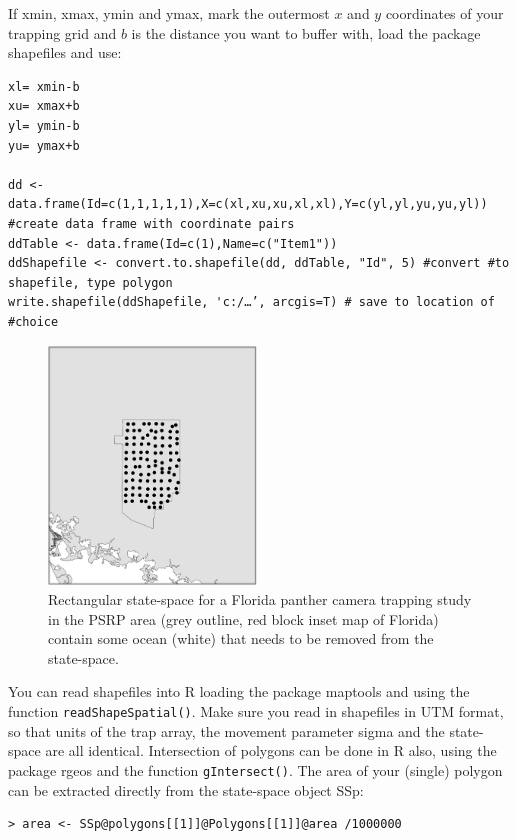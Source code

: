 If xmin, xmax, ymin and ymax, mark the outermost $x$ and $y$ coordinates of your trapping grid and $b$ is the distance you want to buffer with, load the package shapefiles \citep{stabler:2006} and use:
\begin{verbatim}
xl= xmin-b
xu= xmax+b
yl= ymin-b
yu= ymax+b

dd <- data.frame(Id=c(1,1,1,1,1),X=c(xl,xu,xu,xl,xl),Y=c(yl,yl,yu,yu,yl)) #create data frame with coordinate pairs
ddTable <- data.frame(Id=c(1),Name=c("Item1"))
ddShapefile <- convert.to.shapefile(dd, ddTable, "Id", 5) #convert #to shapefile, type polygon
write.shapefile(ddShapefile, 'c:/…’, arcgis=T) # save to location of #choice
\end{verbatim}


\begin{figure}
\begin{center}
\includegraphics[height=2.5in]{Ch7/figs/panthercamera}
\end{center}
\caption{Rectangular state-space for a Florida panther camera trapping
study in the PSRP area (grey outline, red block inset map of Florida)
contain some ocean (white) that needs to be removed from the state-space.}
\label{pantercamera.fig}
\end{figure}

You can read shapefiles into R loading the package maptools
\citep{lewin-koh_etal:2011} and using the function
\verb#readShapeSpatial()#. Make sure you read in shapefiles in UTM format, so
that units of the trap array, the movement parameter sigma and the
state-space are all identical.  Intersection of polygons can be done
in R also, using the package rgeos \citep{bivand_rundel:2011} and the
function \verb#gIntersect()#. The area of your (single) polygon can be
extracted directly from the state-space object SSp:

\begin{verbatim}
> area <- SSp@polygons[[1]]@Polygons[[1]]@area /1000000
\end{verbatim}


